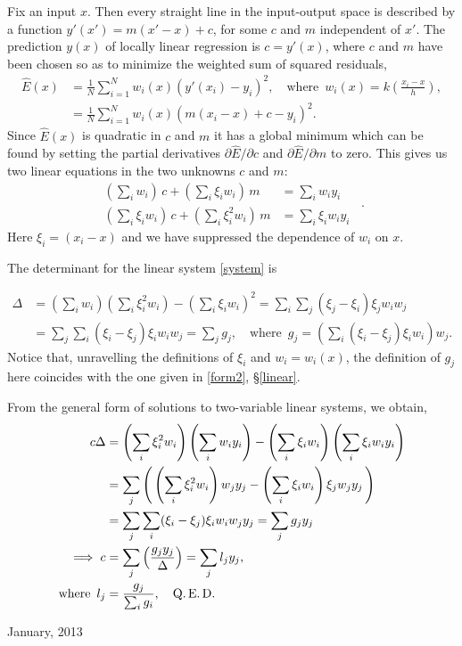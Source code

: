 \documentclass[11pt, reqno]{amsart}
\begin{document}
Fix an input $x$. Then every straight line in the input-output space is
described by a function $y'(x')=m(x'-x) + c $, for some $c$ and $m$
independent of $x'$. The prediction $y(x)$ of locally linear
regression is $c=y'(x)$, where $c$ and $m$ have been chosen so as to
minimize the weighted sum of squared residuals,
\begin{align*}
   \hat E(x) &=\frac{1}{N}\sum_{i=1}^N w_i(x)(y'(x_i) - y_i)^2,\quad
\text{where}\enspace w_i(x)=k\left(\frac{x_i - x}{h}\right),\\
&= \frac{1}{N}\sum_{i=1}^N w_i(x)(m(x_i-x) + c - y_i)^2.
\end{align*}
Since $\hat E(x)$ is quadratic in $c$ and $m$ it has a global minimum
which can be found by setting the partial derivatives $\partial \hat
E/\partial c$ and $\partial \hat E/\partial m$ to zero. This gives us
two linear equations in the two unknowns $c$ and $m$:
\begin{equation}
  \label{system}
  \begin{split}
    \left(\sum_i w_i\right)\,c + \left(\sum_i \xi_i w_i\right)\,m &= \sum_i w_i y_i\\ 
    \left(\sum_i \xi_i w_i\right)\,c + \left(\sum_i \xi_i^2 w_i\right)\, m &= \sum_i \xi_i w_i y_i
  \end{split}\enspace.
\end{equation}
Here $\xi_i=(x_i-x)$ and we have suppressed the dependence of $w_i$ on
$x$.

The determinant for the linear system \eqref{system} is

\begin{align*}
  \Delta &= \left(\sum_i w_i\right) \left(\sum_i \xi_i^2 w_i \right) -
  \left(\sum_i \xi_i w_i \right)^2 
     =\sum_i\sum_j (\xi_j-\xi_i)\xi_j w_i w_j \\
  &=\sum_j\sum_i(\xi_i-\xi_j)\xi_i w_i  w_j = \sum_j
  g_j,\quad\text{where}\enspace g_j=\left(\sum_i(\xi_i -\xi_j)\xi_i
    w_i \right) w_j.
\end{align*}
Notice that, unravelling the definitions of $\xi_i$ and $w_i=w_i(x)$,
the definition of $g_j$ here coincides with the one given in \eqref{form2},
\S\ref{linear}.

From the general form of solutions to two-variable linear systems, we
obtain,
\begin{align*}
  c\Delta&=\left(\sum_i \xi_i^2 w_i \right)\left(\sum_i w_i y_i\right)
   - \left(\sum_i \xi_i w_i \right)\left(\sum_i \xi_i w_i y_i\right)    \\
  &= \sum_j \left(\, \left(\sum_i \xi_i^2 w_i\right)w_j y_j 
    -  \left(\sum_i \xi_i w_i \right) \xi_j w_j y_j \,\right)\\
  &= \sum_j \sum_i(\xi_i-\xi_j)\xi_i w_i w_j y_j = \sum_j g_j y_j\\
\implies c&= \sum_j \left( \frac{g_j y_j}{\Delta} \right) = \sum_j l_j y_j,\\
\text{where}\enspace l_j&= \frac{g_j}{\sum_i g_i},\quad\text{Q.\,E.\,D.}
\end{align*}


January, 2013
\end{document}
